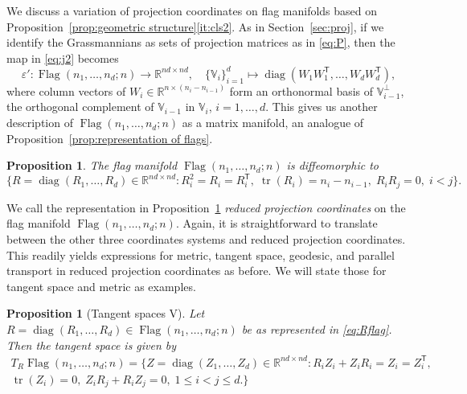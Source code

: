 \documentclass[11pt,reqno]{amsart}%
\newtheorem{proposition}[theorem]{Proposition}
\theoremstyle{definition}
\theoremstyle{remark}
\newcommand{\tp}{{\scriptscriptstyle\mathsf{T}}}
\DeclareMathOperator{\Flag}{Flag}
\DeclareMathOperator{\tr}{tr}
\DeclareMathOperator{\diag}{diag}
\begin{document}
We discuss a variation of projection coordinates on flag manifolds based on  Proposition~\ref{prop:geometric structure}\eqref{it:cls2}. As in Section~\ref{sec:proj}, if we identify the Grassmannians as sets of projection matrices as in \eqref{eq:P}, then the map in \eqref{eq:j2} becomes
\begin{equation}\label{eq:embedding of flag}
\varepsilon': \Flag(n_1,\dots,n_d;n) \to \mathbb{R}^{nd \times nd},\quad \{\mathbb{V}_i\}_{i=1}^d \mapsto \diag(W_1W_1^\tp,\dots, W_dW_d^\tp),
\end{equation}
where column vectors of $W_i\in \mathbb{R}^{n\times (n_i - n_{i-1})}$ form an orthonormal basis of $\mathbb{V}_{i-1}^{\perp}$, the orthogonal complement of $\mathbb{V}_{i-1}$ in $\mathbb{V}_i$, $i =1,\dots,d$. This gives us another description of $\Flag(n_1,\dots,n_d;n)$ as a matrix manifold, an analogue of Proposition~\ref{prop:representation of flags}.
\begin{proposition}\label{prop:reduced coord}
The flag manifold $\Flag(n_1,\dots,n_d;n)$ is diffeomorphic to
\begin{equation}\label{eq:Rflag}
\lbrace
R = \diag(R_1,\dots, R_d)\in \mathbb{R}^{nd \times nd}: R_i^2 = R_i = R_i^\tp,\; \tr (R_i) = n_i - n_{i-1},\; R_i  R_j = 0,\;  i < j
\rbrace.
\end{equation}
\end{proposition}
We call the representation in Proposition~\ref{prop:reduced coord} \emph{reduced projection coordinates} on the flag manifold $\Flag(n_1,\dots,n_d;n)$. Again, it is straightforward to translate between the other three coordinates systems and reduced projection coordinates.
This readily yields expressions for metric, tangent space, geodesic, and parallel transport in reduced projection coordinates as before. We will state those for tangent space and metric as examples.
\begin{proposition}[Tangent spaces V]\label{prop:tangent3}
Let $R = \diag(R_1,\dots,R_d) \in \Flag(n_1,\dots, n_d;n)$ be as represented in \eqref{eq:Rflag}.
Then the tangent space is given by
\begin{multline}\label{eq:tangent3}
T_R\Flag(n_1,\dots,n_d;n) = \lbrace  Z =\diag(Z_1,\dots,Z_d) \in \mathbb{R}^{nd\times nd} :
R_i Z_i + Z_i R_i = Z_i = Z_i^\tp,\\ \tr(Z_i) = 0, \; Z_i R_j + R_i Z_j =0,\;1\le i < j \le d. \rbrace
\end{multline}
\end{proposition}
\end{document}
